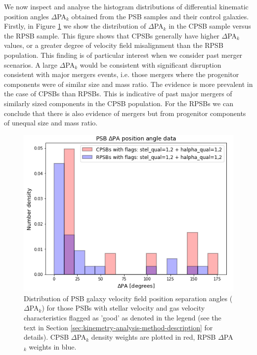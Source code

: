 We now inspect and analyse the histogram distributions of differential kinematic position angles $\Delta$PA$_{k}$ obtained from the PSB samples and their control galaxies. Firstly, in Figure \ref{fig:deltaPAdistribution} we show the distribution of $\Delta$PA$_{k}$ in the CPSB sample versus the RPSB sample. This figure shows that CPSBs generally have higher $\Delta$PA$_{k}$ values, or a greater degree of velocity field misalignment than the RPSB population. This finding is of particular interest when we consider past merger scenarios. A large $\Delta$PA$_{k}$ would be consistent with significant disruption consistent with major mergers events, i.e. those mergers where the progenitor components were of similar size and mass ratio. The evidence is more prevalent in the case of CPSBs than RPSBs. This is indicative of past major mergers of similarly sized components in the CPSB population. For the RPSBs we can conclude that there is also evidence of mergers but from progenitor components of unequal size and mass ratio.

\begin{figure}
    \centering
    \includegraphics[width=\columnwidth]{images/JupyterPlots/Dist-Delta-PA-All-GoodFlags.png}
    \caption[Distribution of PSB stellar and gas velocity field position angles]{Distribution of PSB galaxy velocity field position separation angles ($\Delta$PA$_{k}$) for those PSBs with stellar velocity and gas velocity characteristics flagged as 'good' as denoted in the legend (see the text in Section \ref{sec:kinemetry-analysis-method-description} for details). CPSB $\Delta$PA$_{k}$ density weights are plotted in red, RPSB $\Delta$PA$_{k}$ weights in blue.}
    \label{fig:deltaPAdistribution}
\end{figure}

